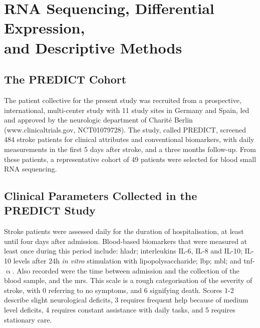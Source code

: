 \section[RNA Sequencing, Differential Expression, and Descriptive Methods]{RNA Sequencing, Differential Expression, \\and Descriptive Methods}

\begin{method}

\subsection{The PREDICT Cohort}
The patient collective for the present study was recruited from a prospective, international, multi-center study with 11 study sites in Germany and Spain, led and approved by the neurologic department of Charité Berlin (www.clinicaltrials.gov, NCT01079728).\cite{Hoffmann2017} The study, called PREDICT, screened 484 stroke patients for clinical attributes and conventional biomarkers, with daily measurements in the first 5 days after stroke, and a three months follow-up. From these patients, a representative cohort of 49 patients were selected for blood small RNA sequencing. 

\subsection{Clinical Parameters Collected in the PREDICT Study}
Stroke patients were assessed daily for the duration of hospitalisation, at least until four days after admission. Blood-based biomarkers that were measured at least once during this period include: \ac{hladr}; interleukins IL-6, IL-8 and IL-10; IL-10 levels after 24h \emph{in vitro} stimulation with lipopolysaccharide; \ac{lbp}; \ac{mbl}; and \ac{tnf}-$\upalpha$. Also recorded were the time between admission and the collection of the blood sample, and the \ac{mrs}. This scale is a rough categorisation of the severity of stroke, with 0 referring to no symptoms, and 6 signifying death. Scores 1-2 describe slight neurological deficits, 3 requires frequent help because of medium level deficits, 4 requires constant assistance with daily tasks, and 5 requires stationary care.


\end{method}
